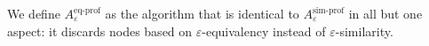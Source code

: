 \documentclass[moor,sglanonrev]{informs4}
\theoremstyle{plain}
\begin{document}
We define $A^{\text{eq-prof}}_{\varepsilon}$ as the algorithm that is identical to $A^{\text{sim-prof}}_{\varepsilon}$ in all but one aspect: it discards nodes based on $\varepsilon$-equivalency instead of $\varepsilon$-similarity.


\end{document}
